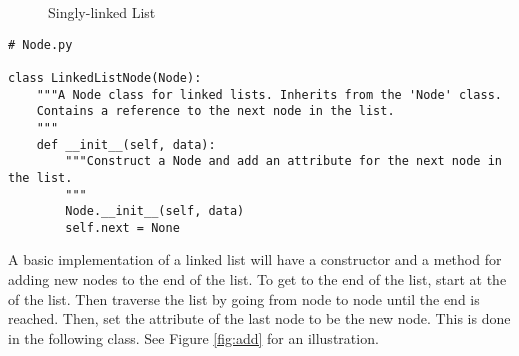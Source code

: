 \begin{figure}
\centering
{}
\caption{Singly-linked List}
\label{fig:singly_linked}
\end{figure}

\begin{lstlisting}
# Node.py

class LinkedListNode(Node):
	"""A Node class for linked lists. Inherits from the 'Node' class.
	Contains a reference to the next node in the list.
	"""
	def __init__(self, data):
		"""Construct a Node and add an attribute for the next node in the list.
		"""
		Node.__init__(self, data)
		self.next = None
\end{lstlisting}

A basic implementation of a linked list will have a constructor and a method for adding new nodes to the end of the list.
To get to the end of the list, start at the  of the list.
Then traverse the list by going from node to node until the end is reached.
Then, set the  attribute of the last node to be the new node.
This is done in the following class.
See Figure \ref{fig:add} for an illustration.

